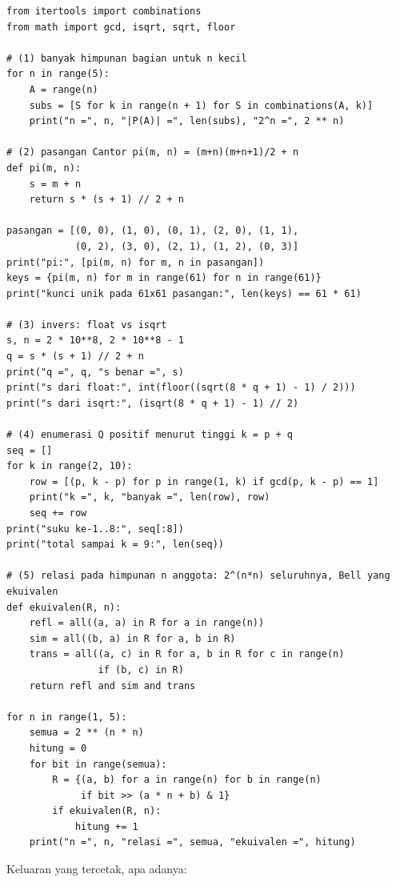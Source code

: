 \begin{lab}
\begin{verbatim}
from itertools import combinations
from math import gcd, isqrt, sqrt, floor

# (1) banyak himpunan bagian untuk n kecil
for n in range(5):
    A = range(n)
    subs = [S for k in range(n + 1) for S in combinations(A, k)]
    print("n =", n, "|P(A)| =", len(subs), "2^n =", 2 ** n)

# (2) pasangan Cantor pi(m, n) = (m+n)(m+n+1)/2 + n
def pi(m, n):
    s = m + n
    return s * (s + 1) // 2 + n

pasangan = [(0, 0), (1, 0), (0, 1), (2, 0), (1, 1),
            (0, 2), (3, 0), (2, 1), (1, 2), (0, 3)]
print("pi:", [pi(m, n) for m, n in pasangan])
keys = {pi(m, n) for m in range(61) for n in range(61)}
print("kunci unik pada 61x61 pasangan:", len(keys) == 61 * 61)

# (3) invers: float vs isqrt
s, n = 2 * 10**8, 2 * 10**8 - 1
q = s * (s + 1) // 2 + n
print("q =", q, "s benar =", s)
print("s dari float:", int(floor((sqrt(8 * q + 1) - 1) / 2)))
print("s dari isqrt:", (isqrt(8 * q + 1) - 1) // 2)

# (4) enumerasi Q positif menurut tinggi k = p + q
seq = []
for k in range(2, 10):
    row = [(p, k - p) for p in range(1, k) if gcd(p, k - p) == 1]
    print("k =", k, "banyak =", len(row), row)
    seq += row
print("suku ke-1..8:", seq[:8])
print("total sampai k = 9:", len(seq))

# (5) relasi pada himpunan n anggota: 2^(n*n) seluruhnya, Bell yang ekuivalen
def ekuivalen(R, n):
    refl = all((a, a) in R for a in range(n))
    sim = all((b, a) in R for a, b in R)
    trans = all((a, c) in R for a, b in R for c in range(n)
                if (b, c) in R)
    return refl and sim and trans

for n in range(1, 5):
    semua = 2 ** (n * n)
    hitung = 0
    for bit in range(semua):
        R = {(a, b) for a in range(n) for b in range(n)
             if bit >> (a * n + b) & 1}
        if ekuivalen(R, n):
            hitung += 1
    print("n =", n, "relasi =", semua, "ekuivalen =", hitung)
\end{verbatim}
\end{lab}

Keluaran yang tercetak, apa adanya:

